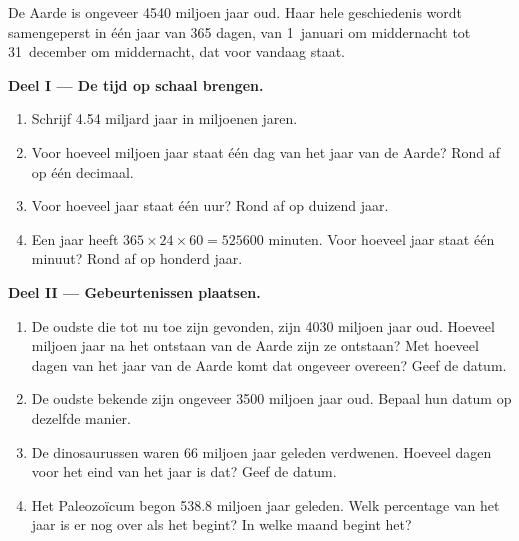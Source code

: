 \begin{problem}
\label{pb:g7:geological-time:1}
De Aarde is ongeveer \num{4540} miljoen jaar oud. Haar hele geschiedenis
wordt samengeperst in één jaar van 365 dagen, van 1~januari om middernacht
tot 31~december om middernacht, dat voor vandaag staat.

\medskip
\noindent\textbf{Deel I --- De tijd op schaal brengen.}\par\nopagebreak
\begin{enumerate}[beginpenalty=10000]
  \item Schrijf \num{4.54} miljard jaar in miljoenen jaren.
  \item Voor hoeveel miljoen jaar staat één dag van het jaar van de Aarde?
        Rond af op één decimaal.
  \item Voor hoeveel jaar staat één uur? Rond af op duizend jaar.
  \item Een jaar heeft $365 \times 24 \times 60 = \num{525600}$ minuten.
        Voor hoeveel jaar staat één minuut? Rond af op honderd jaar.
\end{enumerate}

\medskip
\noindent\textbf{Deel II --- Gebeurtenissen plaatsen.}\par\nopagebreak
\begin{enumerate}[resume, beginpenalty=10000]
  \item De oudste  die tot nu toe zijn gevonden, zijn \num{4030}
        miljoen jaar oud. Hoeveel miljoen jaar na het ontstaan van de Aarde
        zijn ze ontstaan? Met hoeveel dagen van het jaar van de Aarde komt
        dat ongeveer overeen? Geef de datum.
  \item De oudste bekende  zijn ongeveer \num{3500} miljoen jaar
        oud. Bepaal hun datum op dezelfde manier.
  \item De dinosaurussen waren \num{66} miljoen jaar geleden verdwenen.
        Hoeveel dagen voor het eind van het jaar is dat? Geef de datum.
  \item Het Paleozoïcum begon \num{538.8} miljoen jaar geleden. Welk
        percentage van het jaar is er nog over als het begint? In welke
        maand begint het?
\end{enumerate}


\end{problem}
